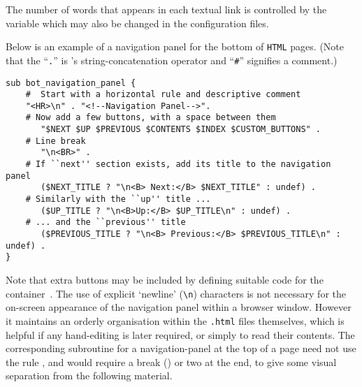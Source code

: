 \html{\\}\noindent
The number of words that appears in each textual link
is controlled by the variable 
which may also be changed in the configuration files.

\html{\\}\noindent
Below is an example of a navigation panel for the bottom of \texttt{HTML} pages.
(Note that the ``\texttt{.}'' is \Perl{}'s string-concatenation operator 
and ``\texttt{\#}'' signifies a comment.)
\begin{small}
\begin{verbatim}
sub bot_navigation_panel {
    #  Start with a horizontal rule and descriptive comment
    "<HR>\n" . "<!--Navigation Panel-->".
    # Now add a few buttons, with a space between them
       "$NEXT $UP $PREVIOUS $CONTENTS $INDEX $CUSTOM_BUTTONS" .	
    # Line break    
       "\n<BR>" .	
    # If ``next'' section exists, add its title to the navigation panel
       ($NEXT_TITLE ? "\n<B> Next:</B> $NEXT_TITLE" : undef) .   
    # Similarly with the ``up'' title ...
       ($UP_TITLE ? "\n<B>Up:</B> $UP_TITLE\n" : undef) . 
    # ... and the ``previous'' title
       ($PREVIOUS_TITLE ? "\n<B> Previous:</B> $PREVIOUS_TITLE\n" : undef) . 
}
\end{verbatim}
\end{small}
Note that extra buttons may be included by defining suitable code for the container
\,. 
The use of explicit `newline' (\verb|\n|) characters is not necessary for the
on-screen appearance of the navigation panel within a browser window. However 
it maintains an orderly organisation within the \texttt{.html} files themselves,
which is helpful if any hand-editing is later required, 
or simply to read their contents.
The corresponding subroutine for a navigation-panel at the top of a page
need not use the rule , and would require a break ()
or two at the end, to give some visual separation from the following material.




